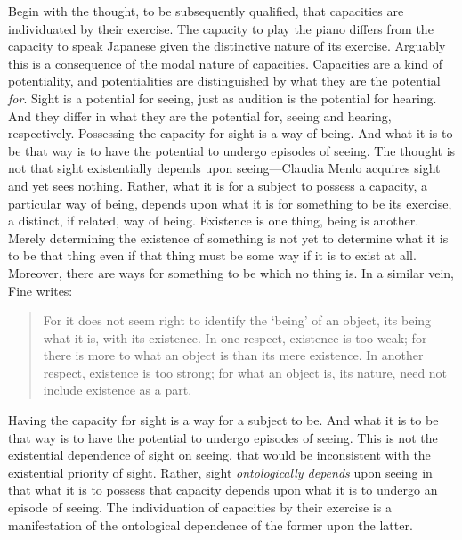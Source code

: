 \documentclass[12pt]{article}
\begin{document}
Begin with the thought, to be subsequently qualified, that capacities are individuated by their exercise. The capacity to play the piano differs from the capacity to speak Japanese given the distinctive nature of its exercise. Arguably this is a consequence of the modal nature of capacities. Capacities are a kind of potentiality, and potentialities are distinguished by what they are the potential \emph{for}. Sight is a potential for seeing, just as audition is the potential for hearing. And they differ in what they are the potential for, seeing and hearing, respectively. Possessing the capacity for sight is a way of being. And what it is to be that way is to have the potential to undergo episodes of seeing. The thought is not that sight existentially depends upon seeing---Claudia Menlo acquires sight and yet sees nothing. Rather, what it is for a subject to possess a capacity, a particular way of being, depends upon what it is for something to be its exercise, a distinct, if related, way of being. Existence is one thing, being is another. Merely determining the existence of something is not yet to determine what it is to be that thing even if that thing must be some way if it is to exist at all. Moreover, there are ways for something to be which no thing is. In a similar vein, Fine writes:
\begin{quote}
	For it does not seem right to identify the `being' of an object, its being what it is, with its existence. In one respect, existence is too weak; for there is more to what an object is than its mere existence. In another respect, existence is too strong; for what an object is, its nature, need not include existence as a part. \citep[274]{Fine:1995ls}
\end{quote}
Having the capacity for sight is a way for a subject to be. And what it is to be that way is to have the potential to undergo episodes of seeing. This is not the existential dependence of sight on seeing, that would be inconsistent with the existential priority of sight. Rather, sight \emph{ontologically depends} upon seeing in that what it is to possess that capacity depends upon what it is to undergo an episode of seeing. The individuation of capacities by their exercise is a manifestation of the ontological dependence of the former upon the latter.
\end{document}
